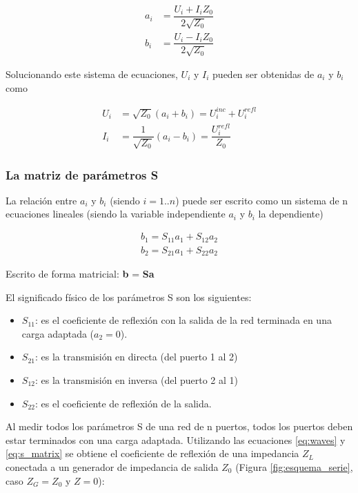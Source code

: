 \begin{equation}
\begin{aligned}
	a_i &= \dfrac{U_i + I_iZ_0}{2\sqrt{Z_0}} \\
	b_i &= \dfrac{U_i - I_iZ_0}{2\sqrt{Z_0}}
\end{aligned}
\label{eq:waves}
\end{equation}

Solucionando este sistema de ecuaciones, $U_i$ y $I_i$ pueden ser obtenidas de $a_i$ y $b_i$ como

\begin{equation}
\begin{aligned}
	U_i &= \sqrt{Z_0}(a_i + b_i) = U_i^{inc} + U_i^{refl}\\
	I_i &= \dfrac{1}{\sqrt{Z_0}}(a_i - b_i) = \dfrac{U_i^{refl}}{Z_0}
\end{aligned}
\end{equation}


\subsubsection{La matriz de parámetros S}

La relación entre $a_i$ y $b_i$ (siendo $i=1..n$) puede ser escrito como un sistema de n ecuaciones lineales (siendo la variable
independiente $a_i$ y $b_i$ la dependiente)

\begin{equation}
\begin{aligned}
	b_1 = S_{11}a_1 + S_{12}a_2 \\
	b_2 = S_{21}a_1 + S_{22}a_2
\end{aligned}
\label{eq:s_matrix}
\end{equation}

Escrito de forma matricial: \textbf{b} = \textbf{Sa}

El significado físico de los parámetros S son los siguientes:
\begin{itemize}
	\item $S_{11}$: es el coeficiente de reflexión con la salida de la red terminada en una carga adaptada ($a_2 = 0$).
	\item $S_{21}$: es la transmisión en directa (del puerto 1 al 2)
	\item $S_{12}$: es la transmisión en inversa (del puerto 2 al 1)
	\item $S_{22}$: es el coeficiente de reflexión de la salida.
\end{itemize}

Al medir todos los parámetros S de una red de n puertos, todos los puertos deben estar terminados con una carga adaptada.
Utilizando las ecuaciones \ref{eq:waves} y \ref{eq:s_matrix} se obtiene el coeficiente de reflexión de una impedancia $Z_L$
conectada a un generador de impedancia de salida $Z_0$ (Figura \ref{fig:esquema_serie}, caso $Z_G = Z_0$ y $Z = 0$):


